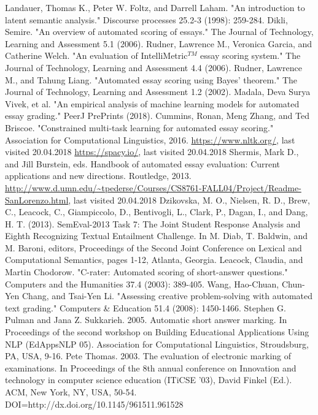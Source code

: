 \documentclass[rnd]{mas_report}
\begin{document}
\begin{thebibliography}{3}
 Landauer, Thomas K., Peter W. Foltz, and Darrell Laham. "An introduction to latent semantic analysis." Discourse processes 25.2-3 (1998): 259-284.
 Dikli, Semire. "An overview of automated scoring of essays." The Journal of Technology, Learning and Assessment 5.1 (2006).
 Rudner, Lawrence M., Veronica Garcia, and Catherine Welch. "An evaluation of IntelliMetric$^{TM}$ essay scoring system." The Journal of Technology, Learning and Assessment 4.4 (2006).
 Rudner, Lawrence M., and Tahung Liang. "Automated essay scoring using Bayes' theorem." The Journal of Technology, Learning and Assessment 1.2 (2002).
 Madala, Deva Surya Vivek, et al. "An empirical analysis of machine learning models for automated essay grading." PeerJ PrePrints (2018).
 Cummins, Ronan, Meng Zhang, and Ted Briscoe. "Constrained multi-task learning for automated essay scoring." Association for Computational Linguistics, 2016.
 \url{https://www.nltk.org/}, last visited 20.04.2018
 \url{https://spacy.io/}, last visited 20.04.2018
 Shermis, Mark D., and Jill Burstein, eds. Handbook of automated essay evaluation: Current applications and new directions. Routledge, 2013.
\url{http://www.d.umn.edu/~tpederse/Courses/CS8761-FALL04/Project/Readme-SanLorenzo.html}, last visited 20.04.2018
 Dzikovska, M. O., Nielsen, R. D., Brew, C., Leacock, C., Giampiccolo, D., Bentivogli, L., Clark, P., Dagan, I., and Dang, H. T. (2013). SemEval-2013 Task 7: The Joint Student Response Analysis and Eighth Recognizing Textual Entailment Challenge. In M. Diab, T. Baldwin, and M. Baroni, editors, Proceedings of the Second Joint Conference on Lexical and Computational Semantics, pages 1-12, Atlanta, Georgia.
  Leacock, Claudia, and Martin Chodorow. "C-rater: Automated scoring of short-answer questions." Computers and the Humanities 37.4 (2003): 389-405.
 Wang, Hao-Chuan, Chun-Yen Chang, and Tsai-Yen Li. "Assessing creative problem-solving with automated text grading." Computers \& Education 51.4 (2008): 1450-1466.
 Stephen G. Pulman and Jana Z. Sukkarieh. 2005. Automatic short answer marking. In Proceedings of the second workshop on Building Educational Applications Using NLP (EdAppsNLP 05). Association for Computational Linguistics, Stroudsburg, PA, USA, 9-16.
 Pete Thomas. 2003. The evaluation of electronic marking of examinations. In Proceedings of the 8th annual conference on Innovation and technology in computer science education (ITiCSE '03), David Finkel (Ed.). ACM, New York, NY, USA, 50-54. DOI=http://dx.doi.org/10.1145/961511.961528

\end{thebibliography}
\end{document}

